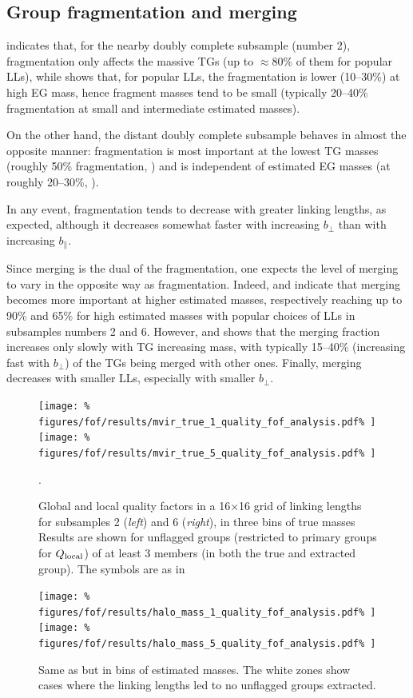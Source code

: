 \subsection{Group fragmentation and merging}

 indicates that, for the nearby doubly complete
subsample (number 2), fragmentation only affects the massive TGs (up to
$\approx$80\% of them for popular LLs), while
 shows that, for popular LLs, the
fragmentation is lower (10--30\%) at high EG mass, hence fragment masses tend
to be small (typically 20--40\% fragmentation at small and intermediate
estimated masses).

On the other hand, the distant doubly complete subsample behaves in almost the
opposite manner: fragmentation is most important at the lowest TG masses
(roughly 50\% fragmentation, ) and is independent
of estimated EG masses (at roughly 20--30\%,
).

In any event, fragmentation tends to decrease with greater linking lengths, as
expected, although it decreases somewhat faster with increasing $b_\perp$ than
with increasing $b_\parallel$.

Since merging is the dual of the fragmentation, one expects the level of
merging to vary  in the opposite way as fragmentation. Indeed,
 and 
indicate that merging becomes more important at higher estimated masses,
respectively reaching up to 90\% and 65\% for high estimated masses with
popular choices of LLs in subsamples numbers 2 and 6. However,
 and  shows that
the merging fraction increases only slowly with TG increasing mass, with
typically 15--40\% (increasing fast with $b_\perp$) of the TGs being merged with
other ones. Finally, merging decreases with smaller LLs, especially with
smaller $b_\perp$.
%
\begin{figure}
    \centering
    \texttt{[image: \%
        figures/fof/results/mvir\_true\_1\_quality\_fof\_analysis.pdf\%
    ]}
    \texttt{[image: \%
        figures/fof/results/mvir\_true\_5\_quality\_fof\_analysis.pdf\%
    ]}
    \caption{Global and local quality factors in a 16$\times$16 grid of linking
        lengths for subsamples 2 (\emph{left}) and 6 (\emph{right}), in three
        bins of true masses Results are shown for unflagged groups (restricted
        to primary groups for $Q_{\rm local}$) of at least 3 members (in both
    the true and extracted group). The symbols are as in
\label{fig:quality_true}}.
\end{figure}
%
\begin{figure}
    \centering
    \texttt{[image: \%
        figures/fof/results/halo\_mass\_1\_quality\_fof\_analysis.pdf\%
    ]}
    \texttt{[image: \%
        figures/fof/results/halo\_mass\_5\_quality\_fof\_analysis.pdf\%
    ]}
    \caption{Same as  but in bins of estimated
    masses. The white zones show cases where the linking lengths led to no
unflagged groups extracted.\label{fig:quality_estimated}}
\end{figure}

